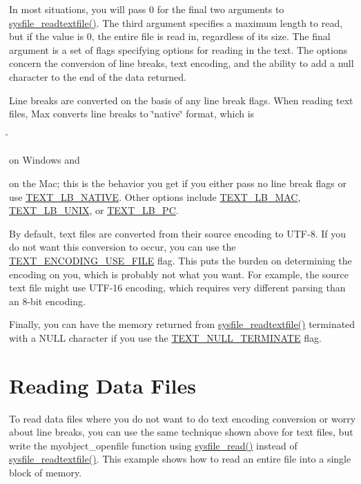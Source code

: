 In most situations, you will pass 0 for the final two arguments to \hyperlink{group__files_gabb35e28302ee972648e61f9a5a61b96a}{sysfile\_\-readtextfile()}. The third argument specifies a maximum length to read, but if the value is 0, the entire file is read in, regardless of its size. The final argument is a set of flags specifying options for reading in the text. The options concern the conversion of line breaks, text encoding, and the ability to add a null character to the end of the data returned.

Line breaks are converted on the basis of any line break flags. When reading text files, Max converts line breaks to \char`\"{}native\char`\"{} format, which is 
\begin{DoxyCode}
 \r\n 
\end{DoxyCode}
 on Windows and 
\begin{DoxyCode}
 \n 
\end{DoxyCode}
 on the Mac; this is the behavior you get if you either pass no line break flags or use \hyperlink{group__files_gga77d70855c1424d078789b0abe6bc94cda37e835ecc979f299ceb51fd54a7846ff}{TEXT\_\-LB\_\-NATIVE}. Other options include \hyperlink{group__files_gga77d70855c1424d078789b0abe6bc94cda6b36993d91f168f154e0163f11f8cd18}{TEXT\_\-LB\_\-MAC}, \hyperlink{group__files_gga77d70855c1424d078789b0abe6bc94cda7832bdacfe3511733462b2550882c852}{TEXT\_\-LB\_\-UNIX}, or \hyperlink{group__files_gga77d70855c1424d078789b0abe6bc94cda1d0804396bf70029f4ad5be27da0fe59}{TEXT\_\-LB\_\-PC}.

By default, text files are converted from their source encoding to UTF-\/8. If you do not want this conversion to occur, you can use the \hyperlink{group__files_gga77d70855c1424d078789b0abe6bc94cdae170ce3b6665f929791e1cfcc00d9eee}{TEXT\_\-ENCODING\_\-USE\_\-FILE} flag. This puts the burden on determining the encoding on you, which is probably not what you want. For example, the source text file might use UTF-\/16 encoding, which requires very different parsing than an 8-\/bit encoding.

Finally, you can have the memory returned from \hyperlink{group__files_gabb35e28302ee972648e61f9a5a61b96a}{sysfile\_\-readtextfile()} terminated with a NULL character if you use the \hyperlink{group__files_gga77d70855c1424d078789b0abe6bc94cda134f84529c248946c91917a1e341a0db}{TEXT\_\-NULL\_\-TERMINATE} flag.\hypertarget{chapter_files_chapter_files_reading_data_files}{}\section{Reading Data Files}\label{chapter_files_chapter_files_reading_data_files}
To read data files where you do not want to do text encoding conversion or worry about line breaks, you can use the same technique shown above for text files, but write the myobject\_\-openfile function using \hyperlink{group__files_gae1ca61adcbe2234246d15bc7d22c4794}{sysfile\_\-read()} instead of \hyperlink{group__files_gabb35e28302ee972648e61f9a5a61b96a}{sysfile\_\-readtextfile()}. This example shows how to read an entire file into a single block of memory.



